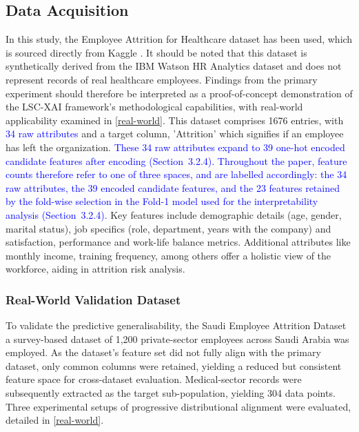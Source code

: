 \documentclass[a4paper,fleqn]{cas-sc}
\begin{document}
\subsection{Data Acquisition}
In this study, the Employee Attrition for Healthcare dataset has been used, which is sourced directly from Kaggle \cite{KaggleHealthcareAttrition}. 
It should be noted that this dataset is synthetically derived from the IBM Watson HR Analytics dataset \cite{ibm_hr_attrition_2017} and does not represent records of real healthcare employees. Findings from the primary experiment should therefore be interpreted as a proof-of-concept demonstration of the LSC-XAI framework's methodological capabilities, with real-world applicability examined in \cref{real-world}. This dataset \cite{KaggleHealthcareAttrition} comprises 1676 entries, with \textcolor{blue}{34 raw attributes} and a target column, 'Attrition' which signifies if an employee has left the organization. \textcolor{blue}{These 34 raw attributes expand to 39 one-hot encoded candidate features after encoding (Section~3.2.4). Throughout the paper, feature counts therefore refer to one of three spaces, and are labelled accordingly: the 34 raw attributes, the 39 encoded candidate features, and the 23 features retained by the fold-wise selection in the Fold-1 model used for the interpretability analysis (Section~3.2.4).} Key features include demographic details (age, gender, marital status), job specifics (role, department, years with the company) and satisfaction, performance and work-life balance metrics. Additional attributes like monthly income, training frequency, among others offer a holistic view of the workforce, aiding in attrition risk analysis.

\subsubsection*{Real-World Validation Dataset}
To validate the predictive generalisability, the Saudi Employee Attrition Dataset \cite{alqahtani2025saudi} a survey-based dataset of 1,200 private-sector employees across Saudi Arabia was employed. As the dataset's feature set did not fully align with the primary dataset, only common columns were retained, yielding a reduced but consistent feature space for cross-dataset evaluation. Medical-sector records were subsequently extracted as the target sub-population, yielding 304 data points. Three experimental setups of progressive distributional alignment were evaluated, detailed in \cref{real-world}.\\
\end{document}
